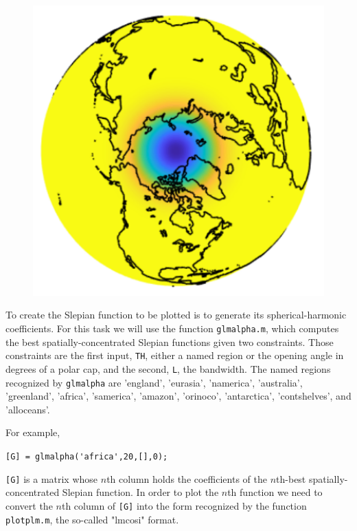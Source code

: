 \documentclass{article}
\begin{document}
\begin{figure}[H]
\includegraphics[scale=.75]{polarcap_ex}
\end{figure}

\setlength{\parskip}{0.5cm plus4mm minus3mm}

To create the Slepian function to be plotted is to generate its spherical-harmonic coefficients. For this task we will use  the function \verb!glmalpha.m!, which computes the best spatially-concentrated Slepian functions given two constraints. Those constraints are the first input, \verb!TH!, either a named region or the opening angle in degrees of a polar cap, and the second, \verb!L!, the bandwidth. The named regions recognized by \verb!glmalpha! are 'england', 'eurasia',  'namerica', 'australia', 'greenland', 'africa', 'samerica', 'amazon', 'orinoco', 'antarctica', 'contshelves', and  'alloceans'.

For example, 

\verb![G] = glmalpha('africa',20,[],0);!


\verb![G]! is a matrix whose $n$th column holds the coefficients of the $n$th-best spatially-concentrated Slepian function. In order to plot the $n$th function we need to convert the $n$th column of \verb![G]! into the form recognized by the function \verb!plotplm.m!, the so-called "lmcosi" format.
\end{document}

